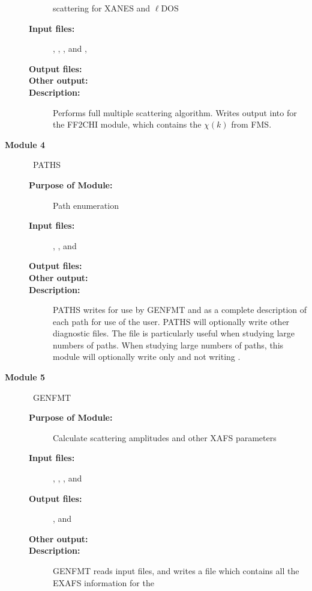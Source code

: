 \documentclass[11pt,oneside]{report} %
\begin{document}
\begin{description}
\begin{description}
  scattering for XANES and $\ell$DOS
  \item[\textbf{Input files:}] , ,
     , and , 
  \item[\textbf{Output files:}] 
  \item[\textbf{Other output:}]
  \item[\textbf{Description:}]  Performs full multiple scattering
    algorithm.
    Writes output into  for the FF2CHI module, which
    contains the $\chi(k)$ from FMS.
  \end{description}
\item [\large\textbf{Module 4}]\dotfill\  {\large\textrm{PATHS}}
  \begin{description}
  \item[\textbf{Purpose of Module:}] Path enumeration
  \item[\textbf{Input files:}] , ,
      and 
  \item[\textbf{Output files:}] 
  \item[\textbf{Other output:}] 
  \item[\textbf{Description:}] PATHS writes  for use by
    GENFMT and as a complete description of each path for use of the
    user.  PATHS will optionally write other diagnostic files.  The
    file  is particularly useful when studying large
    numbers of paths.  When studying large numbers of paths, this
    module will optionally write only  and 
    not writing .
  \end{description}
\item [\large\textbf{Module 5}]\dotfill\  {\large\textrm{GENFMT}}
  \begin{description}
  \item[\textbf{Purpose of Module:}] Calculate scattering amplitudes and other
    XAFS parameters
  \item[\textbf{Input files:}] ,
    , , and 
  \item[\textbf{Output files:}] , and 
  \item[\textbf{Other output:}]
  \item[\textbf{Description:}] GENFMT reads input files, and writes a file
     which contains all the EXAFS information for the

\end{description}
\end{description}
\end{document}
